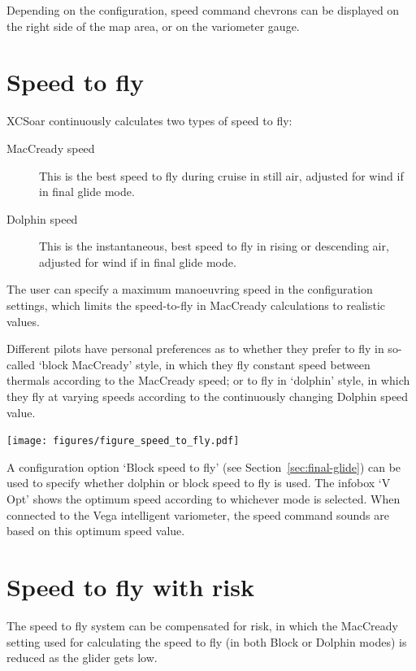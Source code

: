 
Depending on the configuration, speed command chevrons can be
displayed on the right side of the map area, or on the variometer
gauge.

\section{Speed to fly}\label{sec:stf}

XCSoar continuously calculates two types of speed to fly:
\begin{description}
\item[MacCready speed]  This is the best speed to fly during cruise
  in still air, adjusted for wind if in final glide mode.
\item[Dolphin speed]  This is the instantaneous, best speed to fly
  in rising or descending air, adjusted for wind if in final glide
  mode.
\end{description}  

The user can specify a maximum manoeuvring speed in the configuration
settings, which limits the speed-to-fly in MacCready calculations to
realistic values.

Different pilots have personal preferences as to whether they prefer
to fly in so-called `block MacCready' style, in which they fly
constant speed between thermals according to the MacCready speed; or
to fly in `dolphin' style, in which they fly at varying speeds
according to the continuously changing Dolphin speed value.

\begin{maxipage}
\begin{center}
\texttt{[image: figures/figure\_speed\_to\_fly.pdf]}
\end{center}
\end{maxipage}

A configuration option `Block speed to fly' (see
Section~\ref{sec:final-glide}) can be used to specify whether dolphin
or block speed to fly is used.  The infobox `V Opt' shows the optimum
speed according to whichever mode is selected.  When connected to the
Vega intelligent variometer, the speed command sounds are based on
this optimum speed value.

\section{Speed to fly with risk}\label{sec:speed-fly-with}
  The speed to fly system can be compensated for risk, in which the
  MacCready setting used for calculating the speed to fly (in both
  Block or Dolphin modes) is reduced as the glider gets low.

